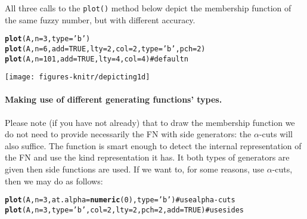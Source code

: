 \documentclass[11pt]{article}\usepackage{graphicx, color}
\makeatletter
\newcommand{\hlfunctioncall}[1]{\textcolor[rgb]{0.501960784313725,0,0.329411764705882}{\textbf{#1}}}%
\newcommand{\hlstring}[1]{\textcolor[rgb]{0.6,0.6,1}{#1}}%
\newcommand{\hlcomment}[1]{\textcolor[rgb]{0.180392156862745,0.6,0.341176470588235}{#1}}%
\newenvironment{kframe}{%
 \def\at@end@of@kframe{}%
 \ifinner\ifhmode%
  \def\at@end@of@kframe{\end{minipage}}%
  \begin{minipage}{\columnwidth}%
 \fi\fi%
 \def\FrameCommand##1{\hskip\@totalleftmargin \hskip-\fboxsep
 \colorbox{shadecolor}{##1}\hskip-\fboxsep
     \hskip-\linewidth \hskip-\@totalleftmargin \hskip\columnwidth}%
 \MakeFramed {\advance\hsize-\width
   \@totalleftmargin\z@ \linewidth\hsize
   \@setminipage}}%
 {\par\unskip\endMakeFramed%
 \at@end@of@kframe}
\newenvironment{knitrout}{}{} %
\makeatother
\begin{document}
All three calls to the \texttt{plot()} method below depict the membership
function of the same fuzzy number, but with different accuracy.

\begin{knitrout}\small
{}\color{fgcolor}\begin{kframe}
\begin{alltt}
\hlfunctioncall{plot}(A, n=3, type=\hlstring{'b'})
\hlfunctioncall{plot}(A, n=6, add=TRUE,  lty=2, col=2, type=\hlstring{'b'}, pch=2)
\hlfunctioncall{plot}(A, n=101, add=TRUE, lty=4, col=4) \hlcomment{# default n}
\end{alltt}
\end{kframe}
\end{knitrout}


\begin{center}
\begin{knitrout}\small
{}\color{fgcolor}

{\centering \texttt{[image: figures-knitr/depicting1d]} 

}



\end{knitrout}

\end{center}




\paragraph{Making use of different generating functions' types.}
Please note (if you have not already) that to draw the membership
function we do not need to provide necessarily the FN with side generators:
the $\alpha$-cuts will also suffice.
The function is smart enough to detect the internal
representation of the FN and use the kind representation it has.
It both types of generators are given then side functions are used.
If we want to, for some reasons, use $\alpha$-cuts, then we may do as follows:

\begin{knitrout}\small
{}\color{fgcolor}\begin{kframe}
\begin{alltt}
\hlfunctioncall{plot}(A, n=3, at.alpha=\hlfunctioncall{numeric}(0), type=\hlstring{'b'}) \hlcomment{# use alpha-cuts}
\hlfunctioncall{plot}(A, n=3, type=\hlstring{'b'}, col=2, lty=2, pch=2, add=TRUE) \hlcomment{# use sides}
\end{alltt}
\end{kframe}
\end{knitrout}
\end{document}
